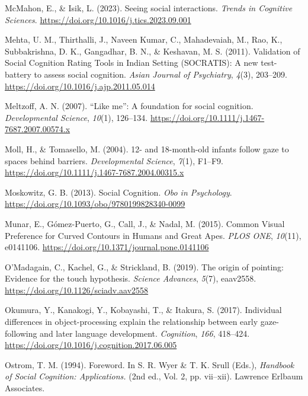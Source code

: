\documentclass[
]{scrbook}
\newlength{\cslhangindent}
\newenvironment{CSLReferences}[2] %
 {\begin{list}{}{%
  \setlength{\itemindent}{0pt}
  \setlength{\leftmargin}{0pt}
  \setlength{\parsep}{0pt}
  \ifodd #1
   \setlength{\leftmargin}{\cslhangindent}
   \setlength{\itemindent}{-1\cslhangindent}
  \fi
  \setlength{\itemsep}{#2\baselineskip}}}
 {\end{list}}
\begin{document}
\begin{CSLReferences}{1}{0}
McMahon, E., \& Isik, L. (2023). Seeing social interactions. \emph{Trends in Cognitive Sciences}. \url{https://doi.org/10.1016/j.tics.2023.09.001}

Mehta, U. M., Thirthalli, J., Naveen Kumar, C., Mahadevaiah, M., Rao, K., Subbakrishna, D. K., Gangadhar, B. N., \& Keshavan, M. S. (2011). Validation of {Social Cognition Rating Tools} in {Indian Setting} ({SOCRATIS}): {A} new test-battery to assess social cognition. \emph{Asian Journal of Psychiatry}, \emph{4}(3), 203--209. \url{https://doi.org/10.1016/j.ajp.2011.05.014}

Meltzoff, A. N. (2007). {``{Like} me''}: A foundation for social cognition. \emph{Developmental Science}, \emph{10}(1), 126--134. \url{https://doi.org/10.1111/j.1467-7687.2007.00574.x}

Moll, H., \& Tomasello, M. (2004). 12- and 18-month-old infants follow gaze to spaces behind barriers. \emph{Developmental Science}, \emph{7}(1), F1--F9. \url{https://doi.org/10.1111/j.1467-7687.2004.00315.x}

Moskowitz, G. B. (2013). Social {Cognition}. \emph{Obo in Psychology}. \url{https://doi.org/10.1093/obo/9780199828340-0099}

Munar, E., Gómez-Puerto, G., Call, J., \& Nadal, M. (2015). Common {Visual Preference} for {Curved Contours} in {Humans} and {Great Apes}. \emph{PLOS ONE}, \emph{10}(11), e0141106. \url{https://doi.org/10.1371/journal.pone.0141106}

O'Madagain, C., Kachel, G., \& Strickland, B. (2019). The origin of pointing: {Evidence} for the touch hypothesis. \emph{Science Advances}, \emph{5}(7), eaav2558. \url{https://doi.org/10.1126/sciadv.aav2558}

Okumura, Y., Kanakogi, Y., Kobayashi, T., \& Itakura, S. (2017). Individual differences in object-processing explain the relationship between early gaze-following and later language development. \emph{Cognition}, \emph{166}, 418--424. \url{https://doi.org/10.1016/j.cognition.2017.06.005}

Ostrom, T. M. (1994). Foreword. In S. R. Wyer \& T. K. Srull (Eds.), \emph{Handbook of {Social Cognition}: {Applications}.} (2nd ed., Vol. 2, pp. vii--xii). Lawrence Erlbaum Associates.


\end{CSLReferences}
\end{document}
